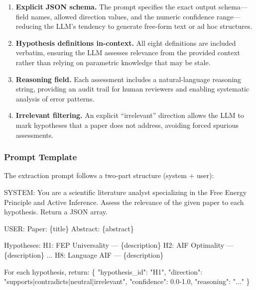 \documentclass[
]{article}
\newenvironment{Shaded}{}{}
\newcommand{\NormalTok}[1]{#1}
\begin{document}
\begin{enumerate}
\def\labelenumi{\arabic{enumi}.}
\item
  \textbf{Explicit JSON schema.} The prompt specifies the exact output
  schema---field names, allowed direction values, and the numeric
  confidence range---reducing the LLM's tendency to generate free-form
  text or ad hoc structures.
\item
  \textbf{Hypothesis definitions in-context.} All eight definitions are
  included verbatim, ensuring the LLM assesses relevance from the
  provided context rather than relying on parametric knowledge that may
  be stale.
\item
  \textbf{Reasoning field.} Each assessment includes a natural-language
  reasoning string, providing an audit trail for human reviewers and
  enabling systematic analysis of error patterns.
\item
  \textbf{Irrelevant filtering.} An explicit ``irrelevant'' direction
  allows the LLM to mark hypotheses that a paper does not address,
  avoiding forced spurious assessments.
\end{enumerate}

\subsubsection{Prompt Template}\label{prompt-template}

The extraction prompt follows a two-part structure (system + user):

\begin{Shaded}
\begin{Highlighting}[]
\NormalTok{SYSTEM: You are a scientific literature analyst specializing in the}
\NormalTok{Free Energy Principle and Active Inference. Assess the relevance of}
\NormalTok{the given paper to each hypothesis. Return a JSON array.}

\NormalTok{USER:}
\NormalTok{Paper: \{title\}}
\NormalTok{Abstract: \{abstract\}}

\NormalTok{Hypotheses:}
\NormalTok{H1: FEP Universality — \{description\}}
\NormalTok{H2: AIF Optimality — \{description\}}
\NormalTok{...}
\NormalTok{H8: Language AIF — \{description\}}

\NormalTok{For each hypothesis, return:}
\NormalTok{\{}
\NormalTok{  "hypothesis\_id": "H1",}
\NormalTok{  "direction": "supports|contradicts|neutral|irrelevant",}
\NormalTok{  "confidence": 0.0{-}1.0,}
\NormalTok{  "reasoning": "..."}
\NormalTok{\}}
\end{Highlighting}
\end{Shaded}
\end{document}
